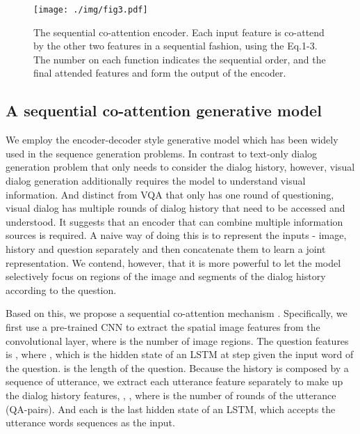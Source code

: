 \documentclass[10pt,twocolumn,letterpaper]{article}
\begin{document}
\begin{figure}[t]
\begin{center}
\texttt{[image: ./img/fig3.pdf]}
\vspace{-8pt}
\end{center}
   \caption{The sequential co-attention encoder. Each input feature is co-attend by the other two features in a sequential fashion, using the Eq.1-3. The number on each function indicates the sequential order, and the final attended features  and  form the output of the encoder.}
\label{coatten}
\vspace{-10pt}
\end{figure}

\subsection{A sequential co-attention generative model}
\label{generator}
We employ the encoder-decoder style generative model which has been widely used in the sequence generation problems. In contrast to text-only dialog generation problem that only needs to consider the dialog history, however, visual dialog generation additionally requires the model to understand visual information. And distinct from VQA that only has one round of questioning, visual dialog has multiple rounds of dialog history that need to be accessed and understood. It suggests that an encoder that can combine multiple information sources is required. A naive way of doing this is to represent the inputs - image, history and question separately and then concatenate them to learn a joint representation. We contend, however, that it is more powerful to let the model selectively focus on regions of the image and segments of the dialog history according to the question. 


Based on this, we propose a sequential co-attention mechanism \cite{wang2016vqa}. Specifically, we first use a pre-trained CNN \cite{simonyan2014very} to extract the spatial image features  from the convolutional layer, where  is the number of image regions. The question features is , where , which is the hidden state of an LSTM at step  given the input word  of the question.  is the length of the question. Because the history  is composed by a sequence of utterance, we extract each utterance feature separately to make up the dialog history features, \ie, , where  is the number of rounds of the utterance (QA-pairs). And each  is the last hidden state of an LSTM, which accepts the utterance words sequences as the input. 
\end{document}
